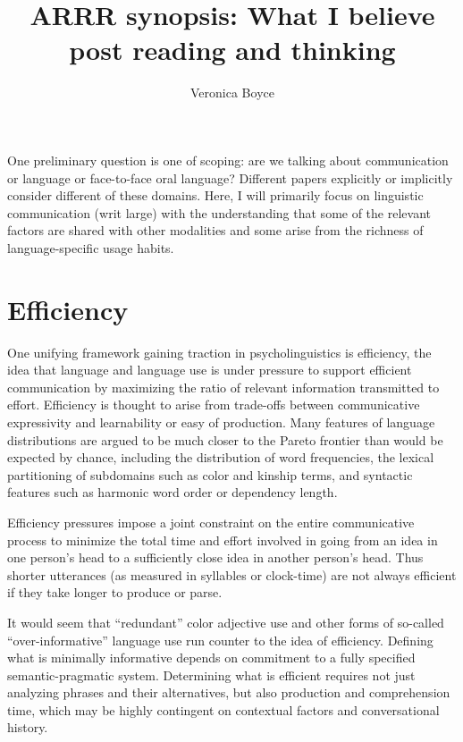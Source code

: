 \documentclass[]{article}
\title{ARRR synopsis: What I believe post reading and thinking}
\author{Veronica Boyce}
\begin{document}
	
	\maketitle
	

One preliminary question is one of scoping: are we talking about communication or language or face-to-face oral language? Different papers explicitly or implicitly consider different of these domains. Here, I will primarily focus on linguistic communication (writ large) with the understanding that some of the relevant factors are shared with other modalities and some arise from the richness of language-specific usage habits. %

\section{Efficiency}
One unifying framework gaining traction in psycholinguistics is efficiency, the idea that language and language use is under pressure to support efficient communication by maximizing the ratio of relevant information transmitted to effort. Efficiency is thought to arise from trade-offs between communicative expressivity and learnability or easy of production. Many features of language distributions are argued to be much closer to the Pareto frontier than would be expected by chance, including the distribution of word frequencies, the lexical partitioning of subdomains such as color and kinship terms, and syntactic features such as harmonic word order or dependency length. 

Efficiency pressures impose a joint constraint on the entire communicative process to minimize the total time and effort involved in going from an idea in one person's head to a sufficiently close idea in another person's head. Thus shorter utterances (as measured in syllables or clock-time) are not always efficient if they take longer to produce or parse. 

It would seem that ``redundant'' color adjective use and other forms of so-called ``over-informative'' language use run counter to the idea of efficiency. Defining what is minimally informative depends on commitment to a fully specified semantic-pragmatic system. Determining what is efficient requires not just analyzing phrases and their alternatives, but also production and comprehension time, which may be highly contingent on contextual factors and conversational history. 
\end{document}

